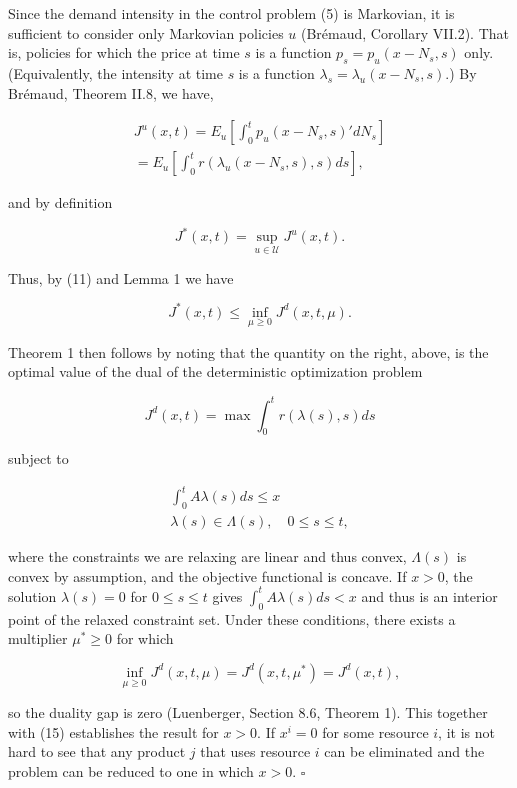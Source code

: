 Since the demand intensity in the control problem (5) is Markovian, it is sufficient to consider only Markovian policies \(u\) (Brémaud, Corollary VII.2). That is, policies for which the price at time \(s\) is a function \(p_s = p_u(x - N_s, s)\) only. (Equivalently, the intensity at time \(s\) is a function \(\lambda_s = \lambda_u(x - N_s, s).\)) By Brémaud, Theorem II.8, we have,

\[
\begin{array}{c}
J^u(x, t) = E_u \left[ \int_{0}^{t} p_u(x - N_s, s)' dN_s \right] \\
= E_u \left[ \int_{0}^{t} r(\lambda_u(x - N_s, s), s) ds \right],
\end{array}
\]

and by definition

\[
J^*(x, t) = \operatorname*{sup}_{u \in \mathcal{U}} J^u(x, t).
\]

Thus, by (11) and Lemma 1 we have

\[
J^*(x, t) \leqslant \inf_{\mu \geqslant 0} J^d(x, t, \mu).
\]

Theorem 1 then follows by noting that the quantity on the right, above, is the optimal value of the dual of the deterministic optimization problem

\[
J^d(x, t) = \operatorname*{max} \int_{0}^{t} r(\lambda(s), s)  ds
\]

subject to

\[
\begin{array}{l}
\displaystyle \int_{0}^{t} A \lambda(s)  ds \leqslant x \\
\displaystyle \lambda(s) \in \Lambda(s), \quad 0 \leqslant s \leqslant t,
\end{array}
\]

where the constraints we are relaxing are linear and thus convex, \(\Lambda(s)\) is convex by assumption, and the objective functional is concave. If \(x > 0\), the solution \(\lambda(s) = 0\) for \(0 \leqslant s \leqslant t\) gives \(\int_{0}^{t} A \lambda(s) ds < x\) and thus is an interior point of the relaxed constraint set. Under these conditions, there exists a multiplier \(\mu^* \geqslant 0\) for which

\[
\inf_{\mu \geqslant 0} J^d(x, t, \mu) = J^d(x, t, \mu^*) = J^d(x, t),
\]

so the duality gap is zero (Luenberger, Section 8.6, Theorem 1). This together with (15) establishes the result for \(x > 0\). If \(x^i = 0\) for some resource \(i\), it is not hard to see that any product \(j\) that uses resource \(i\) can be eliminated and the problem can be reduced to one in which \(x > 0\). \(\square\)

